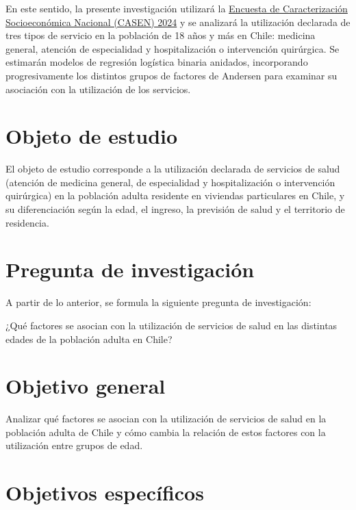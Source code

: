 \documentclass[
  spanish,
  a4paper,
  oneside]{scrbook}
\begin{document}
En este sentido, la presente investigación utilizará la
\href{https://observatorio.ministeriodesarrollosocial.gob.cl/encuesta-casen-2024}{Encuesta
de Caracterización Socioeconómica Nacional (CASEN) 2024} y se analizará
la utilización declarada de tres tipos de servicio en la población de 18
años y más en Chile: medicina general, atención de especialidad y
hospitalización o intervención quirúrgica. Se estimarán modelos de
regresión logística binaria anidados, incorporando progresivamente los
distintos grupos de factores de Andersen para examinar su asociación con
la utilización de los servicios.

\section{Objeto de estudio}\label{objeto-de-estudio}

El objeto de estudio corresponde a la utilización declarada de servicios
de salud (atención de medicina general, de especialidad y
hospitalización o intervención quirúrgica) en la población adulta
residente en viviendas particulares en Chile, y su diferenciación según
la edad, el ingreso, la previsión de salud y el territorio de
residencia.

\section{Pregunta de investigación}\label{pregunta-de-investigaciuxf3n}

A partir de lo anterior, se formula la siguiente pregunta de
investigación:

¿Qué factores se asocian con la utilización de servicios de salud en las
distintas edades de la población adulta en Chile?

\section{Objetivo general}\label{objetivo-general}

Analizar qué factores se asocian con la utilización de servicios de
salud en la población adulta de Chile y cómo cambia la relación de estos
factores con la utilización entre grupos de edad.

\section{Objetivos específicos}\label{objetivos-especuxedficos}
\end{document}
